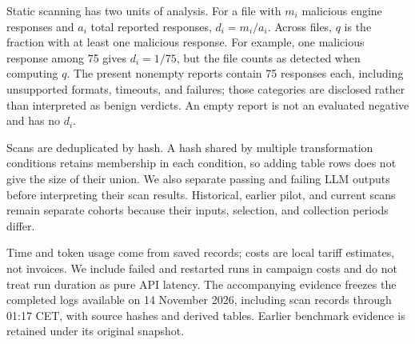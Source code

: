 Static scanning has two units of analysis. For a file with $m_i$ malicious
engine responses and $a_i$ total reported responses, $d_i=m_i/a_i$.
Across files, $q$ is the fraction with at least one malicious response.
For example, one malicious response among 75 gives $d_i=1/75$, but the
file counts as detected when computing $q$. The present nonempty reports
contain 75 responses each, including unsupported formats, timeouts, and
failures; those categories are disclosed rather than interpreted as benign
verdicts. An empty report is not an evaluated negative and has no $d_i$.

Scans are deduplicated by hash. A hash shared by multiple transformation
conditions retains membership in each condition, so adding table rows
does not give the size of their union. We also separate passing and failing
LLM outputs before interpreting their scan results. Historical, earlier
pilot, and current scans remain separate cohorts because their inputs,
selection, and collection periods differ.

Time and token usage come from saved records; costs are local tariff
estimates, not invoices. We include failed and restarted runs in campaign
costs and do not treat run duration as pure API latency. The accompanying
evidence freezes the completed logs available on 14 November 2026, including
scan records through 01:17 CET, with source hashes and derived tables.
Earlier benchmark evidence is retained under its original snapshot.
